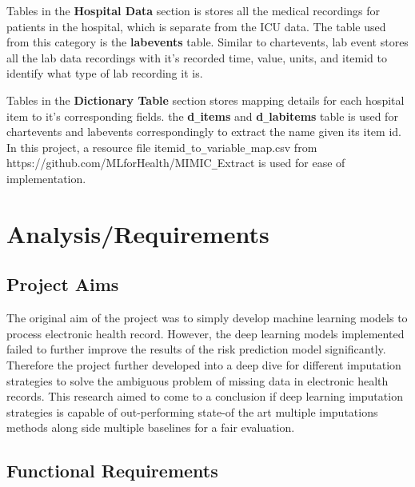 \documentclass{l4proj}
\begin{document}
   Tables in the \textbf{Hospital Data} section is stores all the medical recordings for patients in the hospital, which is separate from the ICU data. The table used from this category is the \textbf{labevents} table. Similar to chartevents, lab event stores all the lab data recordings with it's recorded time, value, units, and itemid to identify what type of lab recording it is.
     
    Tables in the \textbf{Dictionary Table} section stores mapping details for each hospital item to it's corresponding fields. the \textbf{d}\verb|_|\textbf{items} and \textbf{d}\verb|_|\textbf{labitems} table is used for chartevents and labevents correspondingly to extract the name given its item id. In this project, a resource file itemid\verb|_|to\verb|_|variable\verb|_|map.csv from https://github.com/MLforHealth/MIMIC\verb|_|Extract is used for ease of implementation. 


\chapter{Analysis/Requirements}

\section{Project Aims}

The original aim of the project was to simply develop machine learning models to process electronic health record. However, the deep learning models implemented failed to further improve the results of the risk prediction model significantly. Therefore the project further developed into a deep dive for different imputation strategies to solve the ambiguous problem of missing data in electronic health records. This research aimed to come to a conclusion if deep learning imputation strategies is capable of out-performing state-of the art multiple imputations methods along side multiple baselines for a fair evaluation.

\section{Functional Requirements}
\end{document}
